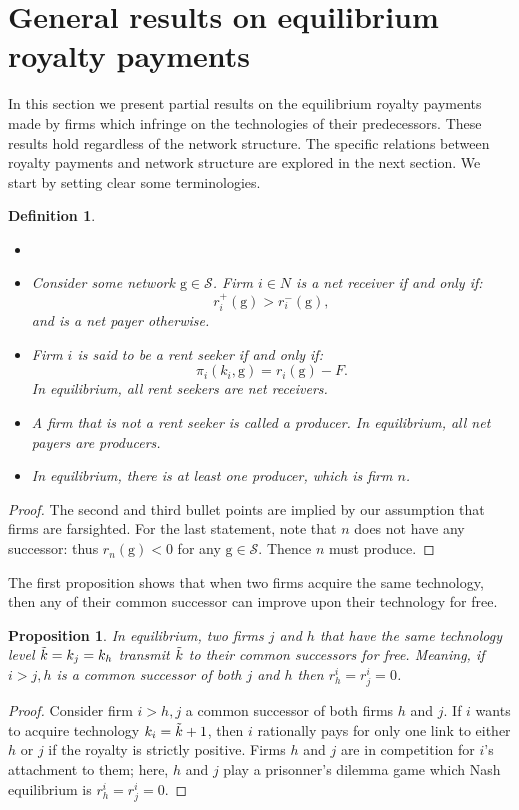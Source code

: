 \documentclass{article}
\newtheorem{proposition}{Proposition}
\newtheorem{definition}{Definition}
\begin{document}
\section{General results on equilibrium royalty payments}
In this section we present partial results on the equilibrium royalty payments made by firms which infringe on the technologies of their predecessors. These results hold regardless of the network structure. The specific relations between royalty payments and network structure are explored in the next section. We start by setting clear some terminologies. 
\begin{definition}\label{netrandp}
\begin{itemize}
\item[]
    \item Consider some network $\text{g}\in \mathcal{S}$. Firm $i\in N$ is a net receiver if and only if: 
    \begin{equation*}
        r_i^+(\text{g})> r_i^-(\text{g}),
    \end{equation*}
    and is a net payer otherwise. 
    \item Firm $i$ is said to be a rent seeker if and only if:
    \begin{equation*}
        \pi_i(k_i,\text{g})=r_i(\text{g})-F.
    \end{equation*}
    In equilibrium, all rent seekers are net receivers. 
    \item A firm that is not a rent seeker is called a producer. In equilibrium, all net payers are producers.
    \item In equilibrium, there is at least one producer, which is firm $n$. 
\end{itemize}
\end{definition}
\begin{proof}
The second and third bullet points are implied by our assumption that firms are farsighted. For the last statement, note that $n$ does not have any successor: thus $r_n(\text{g})<0$ for any $\text{g}\in \mathcal{S}$. Thence $n$ must produce. 
\end{proof}

The first proposition shows that when two firms acquire the same technology, then any of their common successor can improve upon their technology for free. \\ 

\begin{proposition}\label{prop:zerorevenue}
In equilibrium, two firms $j$ and $h$ that have the same technology level $\Tilde{k}=k_j=k_h$ transmit $\Tilde{k}$ to their common successors for free. Meaning, if $i>j,h$ is a common successor of both $j$ and $h$ then $r^{i}_h=r^{i}_j=0$. 
\end{proposition}
\begin{proof}
Consider firm $i>h,j$ a common successor of both firms $h$ and $j$. If $i$ wants to acquire technology $k_i=\Tilde{k}+1$, then $i$ rationally pays for only one link to either $h$ or $j$ if the royalty is strictly positive. Firms $h$ and $j$ are in competition for $i$'s attachment to them; here, $h$ and $j$ play a prisonner's dilemma game which Nash equilibrium is $r^{i}_h=r^{i}_j=0$.
\end{proof}
\end{document}
